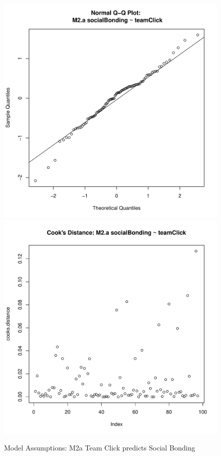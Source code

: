{\begin{figure}[htbp]
  \includegraphics[scale =.4]{images/MLM2aQQNorm.pdf}
  \includegraphics[scale =.4]{images/MLM2aCooksD.pdf}
  \caption{Model Assumptions: M2a Team Click predicts Social Bonding}
  \label{fig:MKM2aAssumptions}
\end{figure}





}
